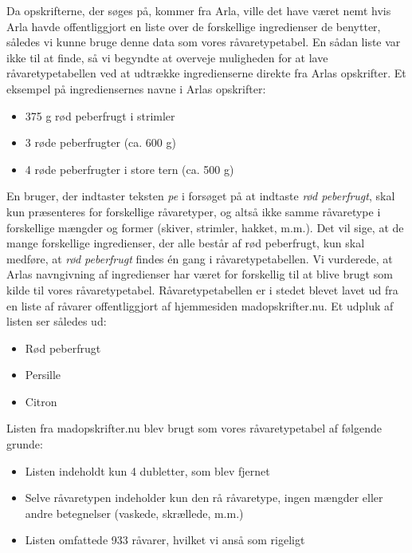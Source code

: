 Da opskrifterne, der søges på, kommer fra Arla, ville det have været nemt hvis Arla havde offentliggjort en liste over de forskellige ingredienser de benytter, således vi kunne bruge denne data som vores råvaretypetabel. En sådan liste var ikke til at finde, så vi begyndte at overveje muligheden for at lave råvaretypetabellen ved at udtrække ingredienserne direkte fra Arlas opskrifter. Et eksempel på ingrediensernes navne i Arlas opskrifter:

\begin{itemize} [noitemsep]
  \item 375 g rød peberfrugt i strimler
  \item 3 røde peberfrugter (ca. 600 g)
  \item 4 røde peberfrugter i store tern (ca. 500 g)
\end{itemize}

En bruger, der indtaster teksten \textit{pe} i forsøget på at indtaste \textit{rød peberfrugt}, skal kun præsenteres for forskellige råvaretyper, og altså ikke samme råvaretype i forskellige mængder og former (skiver, strimler, hakket, m.m.). Det vil sige, at de mange forskellige ingredienser, der alle består af rød peberfrugt, kun skal medføre, at \textit{rød peberfrugt} findes én gang i råvaretypetabellen. Vi vurderede, at Arlas navngivning af ingredienser har været for forskellig til at blive brugt som kilde til vores råvaretypetabel. Råvaretypetabellen er i stedet blevet lavet ud fra en liste af råvarer offentliggjort af hjemmesiden madopskrifter.nu\cite{ingrediensliste}. Et udpluk af listen ser således ud:

\begin{itemize} [noitemsep]
  \item Rød peberfrugt
  \item Persille
  \item Citron
\end{itemize}

Listen fra madopskrifter.nu blev brugt som vores råvaretypetabel af følgende grunde:

\begin{itemize} [noitemsep]
  \item Listen indeholdt kun 4 dubletter, som blev fjernet
  \item Selve råvaretypen indeholder kun den rå råvaretype, ingen mængder eller andre betegnelser (vaskede, skrællede, m.m.)
  \item Listen omfattede 933 råvarer, hvilket vi anså som rigeligt
\end{itemize}

